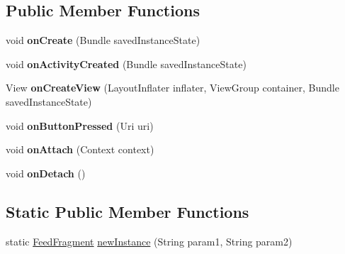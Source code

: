 \subsection*{\-Public \-Member \-Functions}
\begin{DoxyCompactItemize}
\item 
\hypertarget{classcom_1_1example_1_1sel_1_1lostfound_1_1FeedFragment_a027942ee12844b17c604195b91f9948d}{void {\bfseries on\-Create} (\-Bundle saved\-Instance\-State)}\label{classcom_1_1example_1_1sel_1_1lostfound_1_1FeedFragment_a027942ee12844b17c604195b91f9948d}

\item 
\hypertarget{classcom_1_1example_1_1sel_1_1lostfound_1_1FeedFragment_abb8194bc01339ece4f650c3b7e716a5f}{void {\bfseries on\-Activity\-Created} (\-Bundle saved\-Instance\-State)}\label{classcom_1_1example_1_1sel_1_1lostfound_1_1FeedFragment_abb8194bc01339ece4f650c3b7e716a5f}

\item 
\hypertarget{classcom_1_1example_1_1sel_1_1lostfound_1_1FeedFragment_a4e2cc79785d7392af2839c0b3900b12b}{\-View {\bfseries on\-Create\-View} (\-Layout\-Inflater inflater, \-View\-Group container, \-Bundle saved\-Instance\-State)}\label{classcom_1_1example_1_1sel_1_1lostfound_1_1FeedFragment_a4e2cc79785d7392af2839c0b3900b12b}

\item 
\hypertarget{classcom_1_1example_1_1sel_1_1lostfound_1_1FeedFragment_a4a39372816f2c53d6ff1b3d12be98c23}{void {\bfseries on\-Button\-Pressed} (\-Uri uri)}\label{classcom_1_1example_1_1sel_1_1lostfound_1_1FeedFragment_a4a39372816f2c53d6ff1b3d12be98c23}

\item 
\hypertarget{classcom_1_1example_1_1sel_1_1lostfound_1_1FeedFragment_a63947b4cbebd081d42113ff157a2f6b0}{void {\bfseries on\-Attach} (\-Context context)}\label{classcom_1_1example_1_1sel_1_1lostfound_1_1FeedFragment_a63947b4cbebd081d42113ff157a2f6b0}

\item 
\hypertarget{classcom_1_1example_1_1sel_1_1lostfound_1_1FeedFragment_a1cc06e44e371cfc7f6b0bb5da15f78f0}{void {\bfseries on\-Detach} ()}\label{classcom_1_1example_1_1sel_1_1lostfound_1_1FeedFragment_a1cc06e44e371cfc7f6b0bb5da15f78f0}

\end{DoxyCompactItemize}
\subsection*{\-Static \-Public \-Member \-Functions}
\begin{DoxyCompactItemize}
\item 
static \hyperlink{classcom_1_1example_1_1sel_1_1lostfound_1_1FeedFragment}{\-Feed\-Fragment} \hyperlink{classcom_1_1example_1_1sel_1_1lostfound_1_1FeedFragment_a63f279103cc59000c74087d6addb351f}{new\-Instance} (\-String param1, \-String param2)
\end{DoxyCompactItemize}
